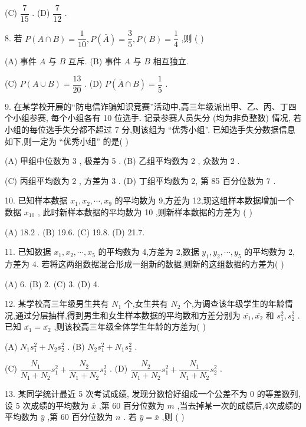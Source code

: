 (C) $\dfrac{7}{15}$ . (D) $\dfrac{7}{12}$ .

8. 若 $P\left( {A \cap  B}\right)  = \dfrac{1}{10},P\left( \bar{A}\right)  = \dfrac{3}{5},P\left( B\right)  = \dfrac{1}{4}$ ,则 (   )

(A) 事件 $A$ 与 $B$ 互斥. (B) 事件 $A$ 与 $B$ 相互独立.

(C) $P\left( {A \cup  B}\right)  = \dfrac{13}{20}$ . (D) $P\left( {\bar{A} \cap  B}\right)  = \dfrac{1}{5}$ .

9. 在某学校开展的“防电信诈骗知识竞赛”活动中,高三年级派出甲、乙、丙、丁四个小组参赛, 每个小组各有 10 位选手. 记录参赛人员失分 (均为非负整数) 情况, 若小组的每位选手失分都不超过 7 分,则该组为 “优秀小组”. 已知选手失分数据信息如下,则一定为 “优秀小组” 的是(   )

(A) 甲组中位数为 3 , 极差为 5 . (B) 乙组平均数为 2 , 众数为 2 .

(C) 丙组平均数为 2 , 方差为 3 . (D) 丁组平均数为 2, 第 85 百分位数为 7 .

10. 已知样本数据 ${x}_{1},{x}_{2},\cdots ,{x}_{9}$ 的平均数为 9,方差为 12,现这组样本数据增加一个数据 ${x}_{10}$ , 此时新样本数据的平均数为 10 ,则新样本数据的方差为 (   )

(A) 18.2 . (B) 19.6. (C) 19.8. (D) 21.7.

11. 已知数据 ${x}_{1},{x}_{2},\cdots ,{x}_{5}$ 的平均数为 4,方差为 2,数据 ${y}_{1},{y}_{2},\cdots ,{y}_{5}$ 的平均数为 2,方差为 4. 若将这两组数据混合形成一组新的数据,则新的这组数据的方差为(   )

(A) 6. (B) 2. (C) 3. (D) 4.

12. 某学校高三年级男生共有 ${N}_{1}$ 个,女生共有 ${N}_{2}$ 个,为调查该年级学生的年龄情况,通过分层抽样,得到男生和女生样本数据的平均数和方差分别为 $\overline{{x}_{1}},\overline{{x}_{2}}$ 和 ${s}_{1}^{2},{s}_{2}^{2}$ . 已知 $\overline{{x}_{1}} = \overline{{x}_{2}}$ ,则该校高三年级全体学生年龄的方差为(   )

(A) ${N}_{1}{s}_{1}^{2} + {N}_{2}{s}_{2}^{2}$ . (B) ${N}_{2}{s}_{1}^{2} + {N}_{1}{s}_{2}^{2}$ .

(C) $\dfrac{{N}_{1}}{{N}_{1} + {N}_{2}}{s}_{1}^{2} + \dfrac{{N}_{2}}{{N}_{1} + {N}_{2}}{s}_{2}^{2}$ . (D) $\dfrac{{N}_{2}}{{N}_{1} + {N}_{2}}{s}_{1}^{2} + \dfrac{{N}_{1}}{{N}_{1} + {N}_{2}}{s}_{2}^{2}$ .

13. 某同学统计最近 5 次考试成绩, 发现分数恰好组成一个公差不为 0 的等差数列, 设 5 次成绩的平均数为 $\bar{x}$ ,第 60 百分位数为 $m$ ,当去掉某一次的成绩后,4次成绩的平均数为 $\bar{y}$ ,第 60 百分位数为 $n$ . 若 $\bar{y} = \bar{x}$ ,则 (   )

